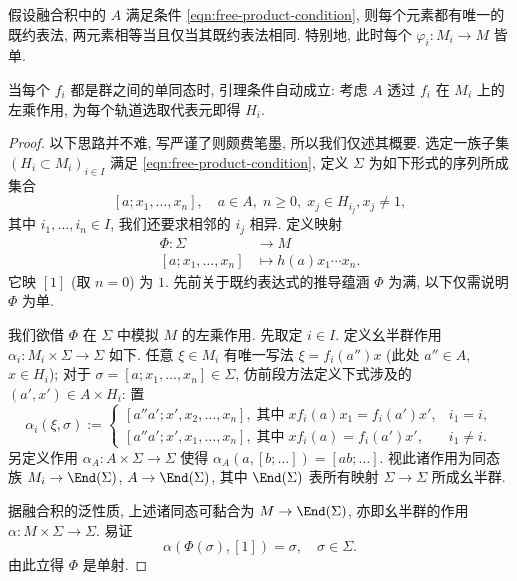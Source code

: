 \begin{lemma}
	假设融合积中的 $A$ 满足条件 \eqref{eqn:free-product-condition}, 则每个元素都有唯一的既约表法, 两元素相等当且仅当其既约表法相同. 特别地, 此时每个 $\varphi_i: M_i \to M$ 皆单.
\end{lemma}
当每个 $f_i$ 都是群之间的单同态时, 引理条件自动成立: 考虑 $A$ 透过 $f_i$ 在 $M_i$ 上的左乘作用, 为每个轨道选取代表元即得 $H_i$.

\begin{proof}
	以下思路并不难, 写严谨了则颇费笔墨, 所以我们仅述其概要. 选定一族子集 $(H_i \subset M_i)_{i \in I}$ 满足 \eqref{eqn:free-product-condition}, 定义 $\Sigma$ 为如下形式的序列所成集合
	\[ [a; x_1, \ldots, x_n], \quad a \in A, \; n \geq 0, \; x_j \in H_{i_j}, x_j \neq 1, \]
	其中 $i_1, \ldots, i_n \in I$, 我们还要求相邻的 $i_j$ 相异. 定义映射
	\begin{align*}
		\Phi: \Sigma & \longrightarrow M \\
		[a; x_1, \ldots, x_n] & \longmapsto h(a)x_1 \cdots x_n.
	\end{align*}
	它映 $[1]$ (取 $n=0$) 为 $1$. 先前关于既约表达式的推导蕴涵 $\Phi$ 为满, 以下仅需说明 $\Phi$ 为单.

	我们欲借 $\Phi$ 在 $\Sigma$ 中模拟 $M$ 的左乘作用. 先取定 $i \in I$. 定义幺半群作用 $\alpha_i: M_i \times \Sigma \to \Sigma$ 如下. 任意 $\xi \in M_i$ 有唯一写法 $\xi = f_i(a'') x$ (此处 $a'' \in A$, $x \in H_i$); 对于 $\sigma = [a; x_1, \ldots, x_n] \in \Sigma$, 仿前段方法定义下式涉及的 $(a', x') \in A \times H_i$: 置
	\[ \alpha_i(\xi, \sigma) :=
	\begin{cases}
		[a'' a'; x', x_2, \ldots, x_n], \;\text{其中}\; x f_i(a) x_1 = f_i(a') x', & i_1 = i, \\
		[a'' a'; x', x_1, \ldots, x_n], \;\text{其中}\; x f_i(a) = f_i(a') x', & i_1 \neq i.
	\end{cases} \]
	另定义作用 $\alpha_A: A \times \Sigma \to \Sigma$ 使得 $\alpha_A(a, [b; \ldots]) = [ab; \ldots]$. 视此诸作用为同态族 $M_i \to \End(\Sigma)$, $A \to \End(\Sigma)$, 其中 $\End(\Sigma)$ 表所有映射 $\Sigma \to \Sigma$ 所成幺半群.

	据融合积的泛性质, 上述诸同态可黏合为 $M \to \End(\Sigma)$, 亦即幺半群的作用 $\alpha: M \times \Sigma \to \Sigma$. 易证
	\[ \alpha(\Phi(\sigma), [1]) = \sigma, \quad \sigma \in \Sigma. \]
	由此立得 $\Phi$ 是单射.
\end{proof}

